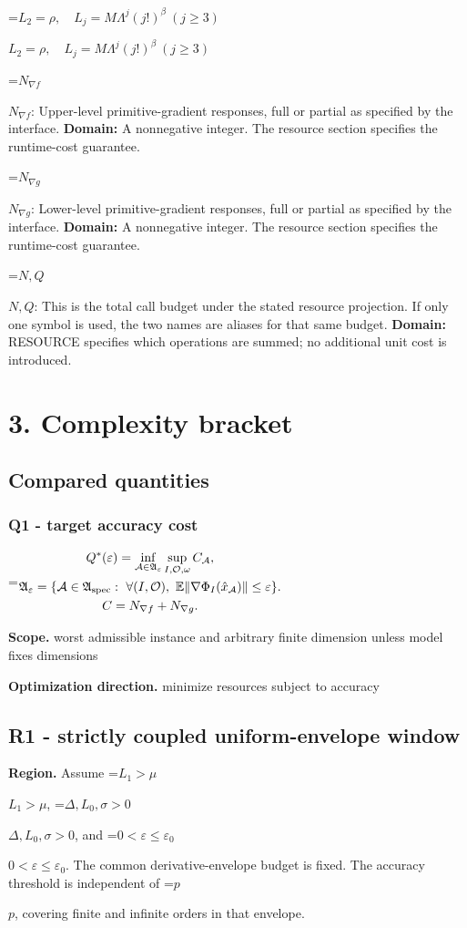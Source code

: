 \documentclass[10pt,a4paper]{article}
\newcommand{\AtlasMath}[1]{\par\begingroup\centering\setbox0=\hbox{$\displaystyle #1$}\ifdim\wd0>1.4\linewidth\typeout{ATLAS WIDE FORMULA: \the\wd0}\fi\ifdim\wd0>\linewidth\resizebox{\linewidth}{!}{\box0}\else\box0\fi\par\endgroup}
\newcommand{\AtlasInlineMath}[1]{\begingroup\setbox0=\hbox{$#1$}\ifdim\wd0>.4\linewidth\endgroup\AtlasMath{#1}\else\endgroup$#1$\fi}
\begin{document}
\AtlasInlineMath{L_2=\rho,\quad L_j=M\Lambda^j(j!)^\beta\ (j\ge3)}

\AtlasInlineMath{N_{\nabla f}}: Upper-level primitive-gradient responses, full or partial as specified by the interface. \textbf{Domain:} A nonnegative integer. The resource section specifies the runtime-cost guarantee.

\AtlasInlineMath{N_{\nabla g}}: Lower-level primitive-gradient responses, full or partial as specified by the interface. \textbf{Domain:} A nonnegative integer. The resource section specifies the runtime-cost guarantee.

\AtlasInlineMath{N,Q}: This is the total call budget under the stated resource projection. If only one symbol is used, the two names are aliases for that same budget. \textbf{Domain:} RESOURCE specifies which operations are summed; no additional unit cost is introduced.

\section{3. Complexity bracket}
\subsection{Compared quantities}
\subsubsection{Q1 - target accuracy cost}
\AtlasMath{\begin{gathered}Q^*(\varepsilon)=\inf_{\mathcal A\in\mathfrak A_\varepsilon}\sup_{I,\mathcal O,\omega}C_{\mathcal A},\\\mathfrak A_\varepsilon=\{\mathcal A\in\mathfrak A_{\rm spec}:\ \forall(I,\mathcal O),\ \mathbb E\|\nabla\Phi_I(\hat x_{\mathcal A})\|\le\varepsilon\}.\\C=N_{\nabla f}+N_{\nabla g}.\end{gathered}}
\textbf{Scope.} worst admissible instance and arbitrary finite dimension unless model fixes dimensions

\textbf{Optimization direction.} minimize resources subject to accuracy

\subsection{R1 - strictly coupled uniform-envelope window}
\textbf{Region.} Assume \AtlasInlineMath{L_1>\mu}, \AtlasInlineMath{\Delta,L_0,\sigma>0}, and \AtlasInlineMath{0<\varepsilon\le\varepsilon_0}. The common derivative-envelope budget is fixed. The accuracy threshold is independent of \AtlasInlineMath{p}, covering finite and infinite orders in that envelope.
\end{document}
